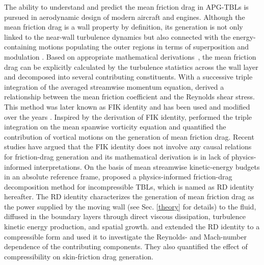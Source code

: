 The ability to understand and predict the mean friction drag in APG-TBLs is  pursued in aerodynamic design of modern aircraft and engines. Although the mean friction drag is a wall property by definition, its generation is not only linked to the near-wall turbulence dynamics but also connected with the energy-containing motions populating the outer regions in terms of superposition and modulation \cite{Hutchins2007,Hutchins2007a,Mathis2009, Fan2019}. 
Based on appropriate mathematical derivations~\cite{Fukagata2002, Renard2016, Yoon2016}, the mean friction drag  can be explicitly calculated by the turbulence statistics across the wall layer and decomposed into several contributing constituents. 
With a successive triple integration of the averaged streamwise momentum equation, \citet{Fukagata2002} derived a relationship between the mean friction coefficient and the Reynolds shear stress. This method was later known as FIK identity and has been used and modified over the years \cite{Peet2009,Mehdi2011,Mehdi2014,Bannier2015}. 
Inspired by the  derivation of FIK identity, \citet{Yoon2016} performed the triple integration on the mean spanwise vorticity equation and quantified the contribution of vortical motions on the generation of mean friction drag. 
Recent studies\cite{Deck2014,Renard2016,Fan2019a} have argued that the FIK identity does not involve any causal relations for friction-drag generation and its mathematical derivation is in lack of physics-informed interpretations.
On the basis of mean streamwise kinetic-energy budgets in an absolute reference frame, \citet{Renard2016} proposed  a physics-informed friction-drag decomposition method for incompressible TBLs, which is named as RD identity hereafter. The RD identity characterizes the generation of mean friction drag as the power supplied by the moving wall (see Sec. \ref{theory} for details) to the fluid, diffused in the boundary layers through direct viscous dissipation, turbulence kinetic energy production, and spatial growth. 
\citet{Li2019} and \citet{Fan2019} extended the RD identity to a compressible form  and used it to investigate the Reynolds- and Mach-number dependence of the contributing components. They also quantified the effect of compressibility on skin-friction drag generation. 


